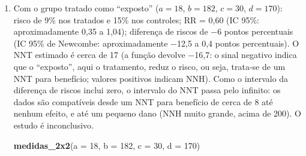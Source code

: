 \documentclass[
]{book}
\newenvironment{Shaded}{\begin{snugshade}}{\end{snugshade}}
\newcommand{\AttributeTok}[1]{\textcolor[rgb]{0.13,0.29,0.53}{#1}}
\newcommand{\DecValTok}[1]{\textcolor[rgb]{0.00,0.00,0.81}{#1}}
\newcommand{\FunctionTok}[1]{\textcolor[rgb]{0.13,0.29,0.53}{\textbf{#1}}}
\newcommand{\NormalTok}[1]{#1}
\begin{document}
\begin{enumerate}
\def\labelenumi{\arabic{enumi}.}
\item
  Com o grupo tratado como ``exposto'' (\(a = 18\), \(b = 182\), \(c = 30\), \(d = 170\)): risco de 9\% nos tratados e 15\% nos controles; RR = 0,60 (IC 95\%: aproximadamente 0,35 a 1,04); diferença de riscos de −6 pontos percentuais (IC 95\% de Newcombe: aproximadamente −12,5 a 0,4 pontos percentuais). O NNT estimado é cerca de 17 (a função devolve −16,7: o sinal negativo indica que o ``exposto'', aqui o tratamento, reduz o risco, ou seja, trata-se de um NNT para benefício; valores positivos indicam NNH). Como o intervalo da diferença de riscos inclui zero, o intervalo do NNT passa pelo infinito: os dados são compatíveis desde um NNT para benefício de cerca de 8 até nenhum efeito, e até um pequeno dano (NNH muito grande, acima de 200). O estudo é inconclusivo.

\begin{Shaded}
\begin{Highlighting}[]
\FunctionTok{medidas\_2x2}\NormalTok{(}\AttributeTok{a =} \DecValTok{18}\NormalTok{, }\AttributeTok{b =} \DecValTok{182}\NormalTok{, }\AttributeTok{c =} \DecValTok{30}\NormalTok{, }\AttributeTok{d =} \DecValTok{170}\NormalTok{)}
\end{Highlighting}
\end{Shaded}


\end{enumerate}
\end{document}
